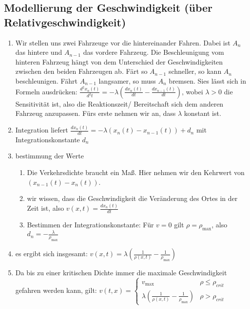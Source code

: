 \documentclass[]{article}
\begin{document}
\subsection*{Modellierung der Geschwindigkeit (über Relativgeschwindigkeit)}
\begin{enumerate}
	\item Wir stellen uns zwei Fahrzeuge vor die hintereinander Fahren. Dabei ist $A_n$ das hintere und $A_{n-1}$ das vordere Fahrzeug. Die Beschleunigung vom hinteren Fahrzeug hängt von dem Unterschied der Geschwindigkeiten zwischen den beiden Fahrzeugen ab. Färt so $A_{n-1}$ schneller, so kann $A_n$ beschleunigen. Fährt $A_{n-1}$ langsamer, so muss $A_n$ bremsen. Sies lässt sich in Formeln ausdrücken: $\frac{d^2 x_n(t)}{d^2 t} = - \lambda \left( \frac{d x_n (t)}{dt} - \frac{d x_{n-1} (t)}{dt} \right)$, wobei $\lambda>0$ die Sensitivität ist, also die Reaktionszeit/ Bereitschaft sich dem anderen Fahrzeug anzupassen. Fürs erste nehmen wir an, dass $\lambda$ konstant ist. 
	\item Integration liefert $\frac{d x_n(t)}{d t} = - \lambda \left( x_n (t) - x_{n-1} (t) \right) + d_n$ mit Integrationskonstante $d_n$
	\item bestimmung der Werte 
	\begin{enumerate}
		\item Die Verkehrsdichte braucht ein Maß. Hier nehmen wir den Kehrwert von $(x_{n-1} (t) - x_{n} (t))$. 
		\item wir wissen, dass die Geschwindigkeit die Veränderung des Ortes in der Zeit ist, also $v(x,t)=\frac{d x_n (t)}{dt} $
		\item Bestimmen der Integrationskonstante: Für $v=0$ gilt $\rho = \rho_{\text{max}}$, also $d_n = -\frac{\lambda}{\rho_{\max}}$		
	\end{enumerate}
	\item es ergibt sich insgesamt: $v(x,t) = \lambda \left( \frac{1}{\rho(x,t)} - \frac{1}{\rho_{\max}} \right)$
	\item Da bis zu einer kritischen Dichte immer die maximale Geschwindigkeit gefahren werden kann, gilt: 
	$v(t,x) =
	\begin{cases}
	v_{\max} & \rho \leq \rho_{crit} \\
	\lambda \left( \frac{1}{\rho(x,t)} - \frac{1}{\rho_{\max}} \right) & \rho > \rho_{crit}
	\end{cases}$
\end{enumerate}
\end{document}
